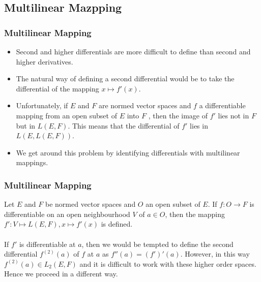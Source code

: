 \documentclass{beamer}
\begin{document}
\subsection{Multilinear Mazpping}
\begin{frame}
\frametitle{Multilinear Mapping}
\begin{itemize}


\item Second and higher differentials are more difficult to define than second and higher
derivatives. 
\item The natural way of defining a second differential would be to take the
differential of the mapping $x \mapsto f'(x)$. 

\item Unfortunately, if $E$ and $F$ are normed vector spaces and $f$ a differentiable mapping from an open subset of $E$ into $F$ , then the image of $f'$ lies not in $F$ but in $L(E,F)$. This means that the differential of $f'$ lies in $L(E,L(E,F))$.
\item  We get around this problem by identifying differentials with multilinear mappings. 

\end{itemize}
\end{frame}



\begin{frame}
\frametitle{Multilinear Mapping}

Let $E$ and $F$ be normed vector spaces and $O$ an open subset of $E$. If $f: O \to F$ is differentiable on an open neighbourhood $V$ of $a \in O$, then the mapping\\
\hspace*{3cm} $f': V \mapsto L(E,F), x \mapsto f'(x)$ is defined.\\~\\

If $f'$ is differentiable at $a$, then we would be tempted to define the second differential $f^{(2)}(a)$ of $f$ at $a$ as $f''(a) = (f')'(a)$. However, in this way $f^{(2)}(a) \in L_2(E,F)$ and it is difficult to work with these higher order spaces. Hence we proceed in a different way.\\



\end{frame}
\end{document}
